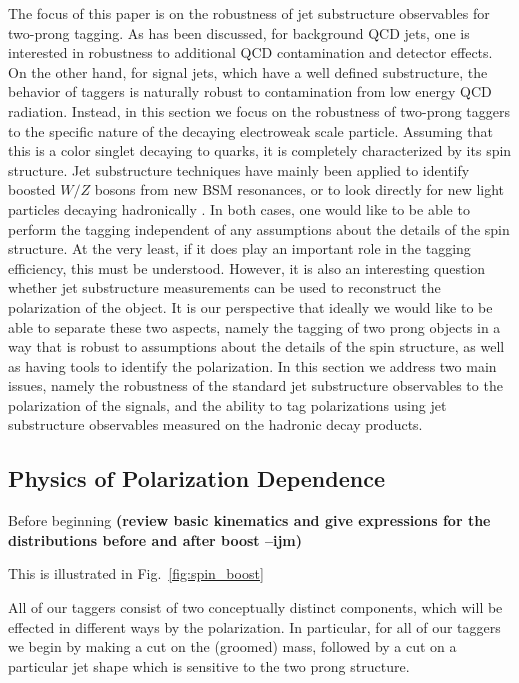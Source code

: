 \documentclass[11pt,letterpaper]{article}
\DeclareRobustCommand{\Fig}[1]{Fig.~\ref{#1}}
\newcommand{\ijm}[1]{\textbf{\textcolor{llblue}{(#1 --ijm)}}}
\begin{document}
The focus of this paper is on the robustness of jet substructure observables for two-prong tagging. As has been discussed, for background QCD jets, one is interested in robustness to additional QCD contamination and detector effects. On the other hand, for signal jets, which have a well defined substructure, the behavior of taggers is naturally robust to contamination from low energy QCD radiation. Instead, in this section we focus on the robustness of two-prong taggers to the specific nature of the decaying electroweak scale particle. Assuming that this is a color singlet decaying to quarks, it is completely characterized by its spin structure. Jet substructure techniques have mainly been applied to identify boosted $W/Z$ bosons from new BSM resonances, or to look directly for new light particles decaying hadronically \cite{CMS-PAS-EXO-17-001}. In both cases, one would like to be able to perform the tagging independent of any assumptions about the details of the spin structure. At the very least, if it does play an important role in the tagging efficiency, this must be understood. However, it is also an interesting question whether jet substructure measurements can be used to reconstruct the polarization of the object. It is our perspective that ideally we would like to be able to separate these two aspects, namely the tagging of two prong objects in a way that is robust to assumptions about the details of the spin structure, as well as having tools to identify the polarization. In this section we address two main issues, namely the robustness of the standard jet substructure observables to the polarization of the signals, and the ability to tag polarizations using jet substructure observables measured on the hadronic decay products.



\subsection{Physics of Polarization Dependence}\label{sec:polar_physics}

Before beginning \ijm{review basic kinematics and give expressions for the distributions before and after boost}

This is illustrated in \Fig{fig:spin_boost}



All of our taggers consist of two conceptually distinct components, which will be effected in different ways by the polarization. In particular, for all of our taggers we begin by making a cut on the (groomed) mass, followed by a cut on a particular jet shape which is sensitive to the two prong structure.
\end{document}
